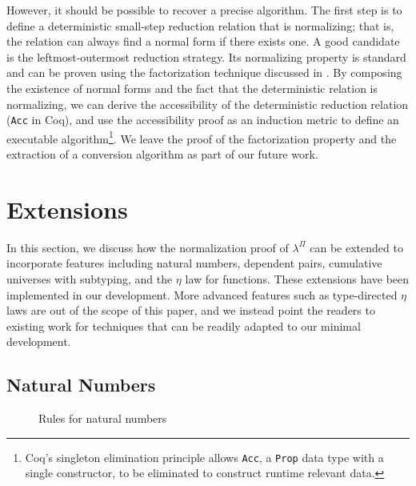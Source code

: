 \documentclass[\ifpublic nolinenum\else\fi,online,OA]{jfp}
\newcommand{\jc}[1]{}
\newcommand{\lang}{$\lambda^{\Pi}$\xspace}
\theoremstyle{definition}
\begin{document}
However, %
it should be possible to recover a
precise algorithm. The first step is to define a deterministic
small-step reduction relation that is normalizing; that is, the
relation can always find a normal form if there exists one. A good
candidate is the leftmost-outermost reduction strategy. Its
normalizing property is standard and can be proven using the
factorization technique discussed in
\citet{takahashi-parallel-reduction, factorization-essentially}. By
composing the existence of normal forms and the fact that the
deterministic relation is normalizing, we can derive the
accessibility of the deterministic reduction relation
(\texttt{Acc} in Coq), and use the accessibility proof as
an induction metric to define an executable algorithm\footnote{Coq's
  singleton elimination principle allows \texttt{Acc}, a
  \texttt{Prop} data type with a single constructor, to be eliminated
  to construct runtime relevant data.}. We leave the proof of the
factorization property and the extraction of a conversion algorithm as
part of our future work.
\fi

\section{Extensions}

In this section, we discuss how the normalization
proof of \lang can be extended to incorporate features including
natural numbers, dependent pairs, cumulative
universes with subtyping, and the $\eta$ law for functions. These
extensions have been implemented in our development. More advanced
features such as type-directed $\eta$ laws are out of the scope of
this paper, and we instead point the readers to existing work for
techniques that can be readily adapted to our minimal development.

\jc{We may want to briefly mention the LOC for each addition?}

\subsection{Natural Numbers}
\begin{figure}
  \vspace{-\baselineskip}
  \begin{mathpar}
  \end{mathpar}
\caption{Rules for natural numbers}
\label{fig:nat}
\end{figure}
\end{document}
